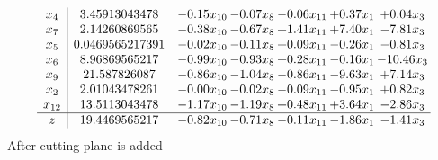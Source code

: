 \documentclass[8pt]{article}
\begin{document}
\[\begin{array}{c| c c@{\hskip 2pt} c@{\hskip 2pt} c@{\hskip 2pt} c@{\hskip 2pt} c@{\hskip 2pt} }
 x_{4}   &  3.45913043478 & -0.15 x_{10} & -0.07 x_{8} & -0.06 x_{11} & +  0.37 x_{1} & +  0.04 x_{3}\\
 x_{7}   &  2.14260869565 & -0.38 x_{10} & -0.67 x_{8} & +  1.41 x_{11} & +  7.40 x_{1} & -7.81 x_{3}\\
 x_{5}   &  0.0469565217391 & -0.02 x_{10} & -0.11 x_{8} & +  0.09 x_{11} & -0.26 x_{1} & -0.81 x_{3}\\
 x_{6}   &  8.96869565217 & -0.99 x_{10} & -0.93 x_{8} & +  0.28 x_{11} & -0.16 x_{1} & -10.46 x_{3}\\
 x_{9}   &  21.587826087 & -0.86 x_{10} & -1.04 x_{8} & -0.86 x_{11} & -9.63 x_{1} & +  7.14 x_{3}\\
 x_{2}   &  2.01043478261 & -0.00 x_{10} & -0.02 x_{8} & -0.09 x_{11} & -0.95 x_{1} & +  0.82 x_{3}\\
 x_{12}   &  13.5113043478 & -1.17 x_{10} & -1.19 x_{8} & +  0.48 x_{11} & +  3.64 x_{1} & -2.86 x_{3}\\
\hline
z    &  19.4469565217 & -0.82 x_{10} & -0.71 x_{8} & -0.11 x_{11} & -1.86 x_{1} & -1.41 x_{3}\\
\end{array}\]
 After cutting plane is added 
\end{document}
